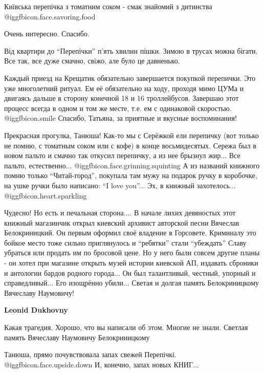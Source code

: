 \begin{itemize}
Київська перепічка з томатним соком - смак знайомий з дитинства  @igg{fbicon.face.savoring.food} 

Очень интересно. Спасибо.

Від квартири до \enquote{Перепічки} п'ять хвилин пішки. Зимою в трусах можна бігати.
Все так, все дуже смачно, свіжо, але було це давненько.


Каждый приезд на Крещатик обязательно завершается покупкой перепички. Это уже
многолетний ритуал. Ем её обязательно на ходу, проходя мимо ЦУМа и двигаясь
дальше в сторону конечной 18 и 16 троллейбусов. Завершаю этот процесс всегда в
одном и том же месте, т.е. ем с одинаковой скоростью.  @igg{fbicon.smile}
Спасибо, Татьяна, за приятные и вкусные воспоминания!


Прекрасная прогулка, Танюша! Как-то мы с Серёжкой ели перепичку (вот только не
помню, с томатным соком или с кофе) в конце восьмидесятых. Сережа был в новом
пальто и смачно так откусил перепичку, а из нее брызнул жир... Все пальто,
естественно...  @igg{fbicon.face.grinning.squinting}  А из названий книжного помню только \enquote{Читай-город}, покупала
там мужу на подарок ручку в коробочке, на ушке ручки было написано: \enquote{I love
you}... Эх, в книжный захотелось...  @igg{fbicon.heart.sparkling} 


Чудесно! Но есть и печальная сторона.... В начале лихих девяностых этот книжный
магазинчик открыл киевский архивист авторской песни Вячеслав Белокриницкий. Он
первым оформил своё владение в Горсовете. Криминалу это бойкое место тоже
сильно приглянулось и \enquote{ребятки} стали \enquote{убеждать} Славу убраться или продать им
по бросовой цене. Но у него были совсем другие планы - он хотел при магазине
открыть музей истории киевской АП, издавать сброники и антологии бардов родного
города... Он был талантливый, честный, упорный и справедливый... Его изощрённо
убили... Светая и долгая память Белокриницкому Вячеславу Наумовичу!

\textbf{Leonid Dukhovny} 

Какая трагедия. Хорошо, что вы написали об этом. Многие не знали. Светлая
память Вячеславу Наумовичу Белокриницкому

Танюша, прямо почувствовала запах свежей Перепічкі. @igg{fbicon.face.upside.down} 
И, конечно, запах новых КНИГ...


\end{itemize}
